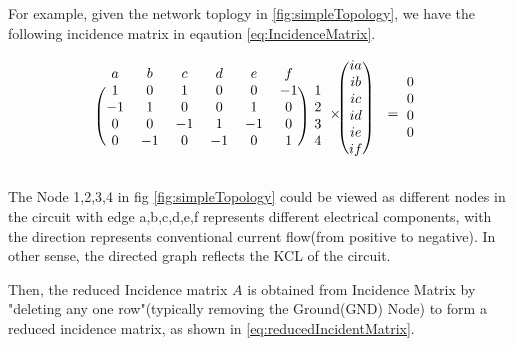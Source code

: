 \documentclass[conference]{IEEEtran}
\begin{document}
For example, given the network toplogy in \ref{fig:simpleTopology}, we have the following incidence matrix in eqaution \ref{eq:IncidenceMatrix}.

\begin{equation}
  \begin{array}{c@{}c@{}c@{}c@{}c}  %
  \begin{blockarray}{ccccccc}
  a & b & c & d & e & f \\
  \begin{block}{(cccccc)c}
    1 & 0 & 1 & 0 & 0 & -1 & 1 \\
    -1 & 1 & 0 & 0 & 1 & 0 & 2 \\
    0 & 0 & -1 & 1 & -1 & 0 & 3 \\
    0 & -1 & 0 & -1 & 0 & 1 & 4 \\
  \end{block}
  \end{blockarray}
  &
  \times
  &
  \begin{blockarray}{cc}
  \begin{block}{(c)c}
    ia & \\
    ib & \\
    ic & \\ 
    id & \\
    ie & \\ 
    if & \\
  \end{block}
  \end{blockarray}
  & 
  =
  &
  \begin{blockarray}{c}
  \begin{block}{c}
    0\\
    0\\
    0\\
    0\\
  \end{block}
  \end{blockarray}
  \end{array}
  \label{eq:IncidenceMatrix}
\end{equation}

The Node 1,2,3,4 in  fig \ref{fig:simpleTopology} could be viewed as different nodes in the circuit with edge a,b,c,d,e,f 
represents different electrical components, with the direction represents conventional current flow(from positive to negative).
In other sense, the directed graph reflects the KCL of the circuit.

Then, the reduced Incidence matrix \(A\) is obtained from Incidence Matrix by 
"deleting any one row"(typically removing the Ground(GND) Node) to form a reduced incidence matrix, as shown in \ref{eq:reducedIncidentMatrix}.
\end{document}
